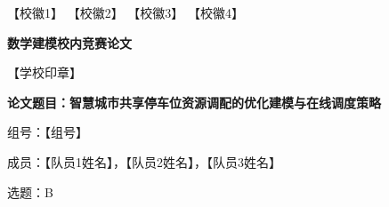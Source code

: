 \documentclass[12pt,a4paper]{ctexart}
\newcommand{\msyh}{\sffamily}
\newcommand{\covertitle}{数学建模校内竞赛论文}
\newcommand{\papertitle}{智慧城市共享停车位资源调配的优化建模与在线调度策略}
\newcommand{\groupnumber}{【组号】}
\newcommand{\problemselection}{B}
\newcommand{\memberonename}{【队员1姓名】}
\newcommand{\membertwoname}{【队员2姓名】}
\newcommand{\memberthreename}{【队员3姓名】}
\begin{document}
\thispagestyle{empty}


\begin{center}
  【校徽1】\hspace{0.3in}%
  【校徽2】\hspace{0.3in}%
  【校徽3】\hspace{0.3in}%
  【校徽4】
\end{center}

\vspace{0.2in}
\begin{center}
  {\msyh\LARGE\bfseries \covertitle}
\end{center}

\begin{center}
  【学校印章】
\end{center}

\vspace{0.3in}

{\msyh\large\bfseries 论文题目：\papertitle}

\vspace{0.25in}

{\msyh\large 组号：\groupnumber}

\vspace{0.2in}

{\msyh\large 成员：\memberonename，\membertwoname，\memberthreename}

\vspace{0.2in}

{\msyh\large 选题：\problemselection}

\vspace{0.3in}
\end{document}
